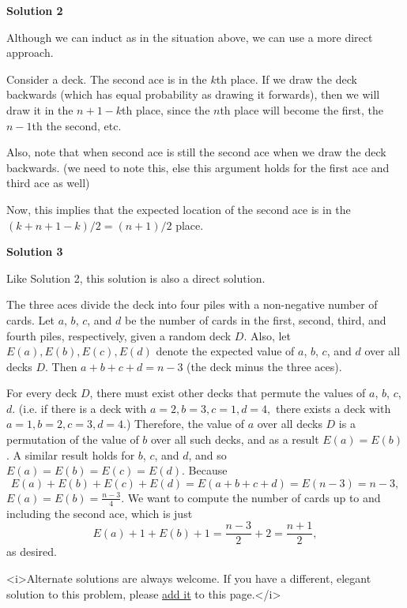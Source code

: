 \begin{enumerate}
 



\textbf{Solution 2}

Although we can induct as in the situation above, we can use a more direct approach.

 Consider a deck.  The second ace is in the $k$th place.  If we draw the deck backwards (which has equal probability as drawing it forwards), then we will draw it in the $n+1-k$th place, since the $n$th place will become the first, the $n-1$th the second, etc.

 Also, note that when second ace is still the second ace when we draw the deck backwards. (we need to note this, else this argument holds for the first ace and third ace as well)

 Now, this implies that the expected location of the second ace is in the $(k+n+1-k)/2=(n+1)/2$ place.

 


 



\textbf{Solution 3}

Like Solution 2, this solution is also a direct solution.

 The three aces divide the deck into four piles with a non-negative number of cards. Let $a$, $b$, $c$, and $d$ be the number of cards in the first, second, third, and fourth piles, respectively, given a random deck $D$. Also, let $E(a), E(b), E(c), E(d)$ denote the expected value of $a$, $b$, $c$, and $d$ over all decks $D$. Then $a + b + c + d = n - 3$ (the deck minus the three aces).

 For every deck $D$, there must exist other decks that permute the values of $a$, $b$, $c$, $d$. (i.e. if there is a deck with $a = 2, b = 3, c = 1, d = 4,$ there exists a deck with $a = 1, b = 2, c = 3, d = 4$.) Therefore, the value of $a$ over all decks $D$ is a permutation of the value of $b$ over all such decks, and as a result $E(a) = E(b)$. A similar result holds for $b$, $c$, and $d$, and so $E(a) = E(b) = E(c) = E(d)$. Because 
 \[E(a) + E(b) + E(c) + E(d) = E(a + b + c + d) = E(n-3) = n-3,\] $E(a) = E(b) = \frac{n-3}{4}$. We want to compute the number of cards up to and including the second ace, which is just 
 \[E(a) + 1 + E(b) + 1 = \frac{n-3}{2} + 2 = \frac{n+1}{2},\] as desired.

 
<i>Alternate solutions are always welcome. If you have a different, elegant solution to this problem, please \href{https://artofproblemsolving.com/wiki/index.php?title=1975\_USAMO\_Problems/Problem\_5&action=edit}{add it} to this page.</i>



\end{enumerate}